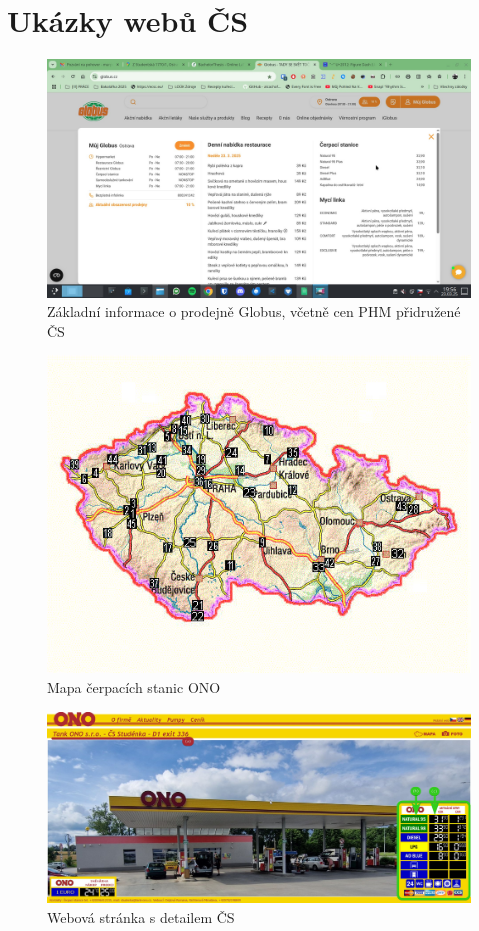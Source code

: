 \chapter{Ukázky webů ČS}

\begin{figure}
    \centering
    \includegraphics[width=\textwidth]{Figures/globus_vyber.jpg}
    \caption{Základní informace o prodejně Globus, včetně cen PHM
        přidružené ČS}
    \label{fig:globus-cs}
\end{figure}

\begin{figure}
    \centering
    \includegraphics[width=\textwidth]{Figures/map_pump.jpg}
    \caption{Mapa čerpacích stanic ONO}
    \label{fig:tank-ono-mapa}
\end{figure}

\begin{figure}
    \centering
    \includegraphics[width=\textwidth]{Figures/tank-ono-cs.jpg}
    \caption{Webová stránka s detailem ČS}
    \label{fig:tank-ono-stranka}
\end{figure}

\endinput
